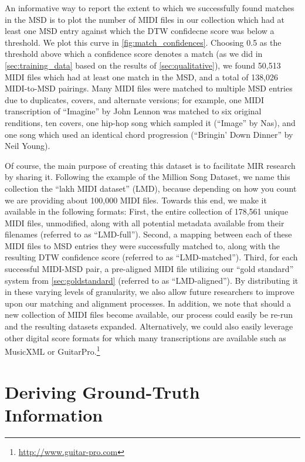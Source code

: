 An informative way to report the extent to which we successfully found matches in the MSD is to plot the number of MIDI files in our collection which had at least one MSD entry against which the DTW confidecne score was below a threshold.
We plot this curve in \cref{fig:match_confidences}.
Choosing 0.5 as the threshold above which a confidence score denotes a match (as we did in \cref{sec:training_data} based on the results of \cref{sec:qualitative}), we found 50,513 MIDI files which had at least one match in the MSD, and a total of 138,026 MIDI-to-MSD pairings.
Many MIDI files were matched to multiple MSD entries due to duplicates, covers, and alternate versions; for example, one MIDI transcription of ``Imagine'' by John Lennon was matched to six original renditions, ten covers, one hip-hop song which sampled it (``Image'' by Nas), and one song which used an identical chord progression (``Bringin' Down Dinner'' by Neil Young).


Of course, the main purpose of creating this dataset is to facilitate MIR research by sharing it.
Following the example of the Million Song Dataset, we name this collection the ``lakh MIDI dataset'' (LMD), because depending on how you count we are providing about 100,000 MIDI files.
Towards this end, we make it available in the following formats:
First, the entire collection of 178,561 unique MIDI files, unmodified, along with all potential metadata available from their filenames (referred to as ``LMD-full'').
Second, a mapping between each of these MIDI files to MSD entries they were successfully matched to, along with the resulting DTW confidence score (referred to as ``LMD-matched'').
Third, for each successful MIDI-MSD pair, a pre-aligned MIDI file utilizing our ``gold standard'' system from \cref{sec:goldstandard} (referred to as ``LMD-aligned'').
By distributing it in these varying levels of granularity, we also allow future researchers to improve upon our matching and alignment processes.
In addition, we note that should a new collection of MIDI files become available, our process could easily be re-run and the resulting datasets expanded.
Alternatively, we could also easily leverage other digital score formats for which many transcriptions are available such as MusicXML \cite{good2001musicxml} or GuitarPro.\footnote{\url{http://www.guitar-pro.com}}

\section{Deriving Ground-Truth Information}
\label{sec:deriving}

